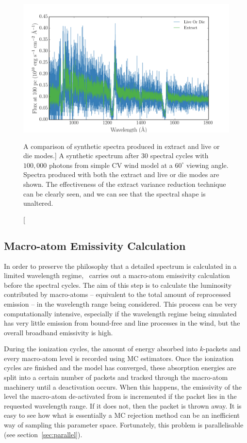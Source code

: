 \begin{figure}
\centering
\includegraphics[width=1.0\textwidth]{figures/03-radtrans/extract_demo.png}
\caption
[A comparison of synthetic spectra produced in extract and live or die modes.]
{
A synthetic spectrum after $30$ spectral cycles with $100,000$ photons
from simple CV wind model at a $60^\circ$ viewing angle.
Spectra produced with both the extract and live or die modes
are shown. The effectiveness of the extract variance reduction technique can
be clearly seen, and we can see that the spectral shape is unaltered.
} 
\label{fig:extract_demo}
\end{figure}

\subsection{Macro-atom Emissivity Calculation}

In order to preserve the philosophy that a detailed 
spectrum is calculated in a limited wavelength regime, \py\ carries
out a macro-atom emissivity calculation before the spectral cycles.
The aim of this step is to calculate the luminosity contributed
by macro-atoms -- equivalent to the total amount of reprocessed emission -- 
in the wavelength range being considered.
This process can be very computationally intensive, especially if the wavelength regime
being simulated has very little emission from bound-free and line processes
in the wind, but the overall broadband emissivity is high.

During the ionization cycles, the amount of energy absorbed into $k$-packets and 
every macro-atom level is recorded using MC estimators. Once 
the ionization cycles are finished and the model has converged, these absorption
energies are split into a certain number of packets and tracked through
the macro-atom machinery until a deactivation occurs. When this happens,
the emissivity of the level the macro-atom de-activated from is incremented
if the packet lies in the requested wavelength range. If it does not, then 
the packet is thrown away. It is easy to see how what is essentially a MC rejection
method can be an inefficient way of sampling this parameter space. Fortunately,
this problem is parallelisable (see section~\ref{sec:parallel}).

